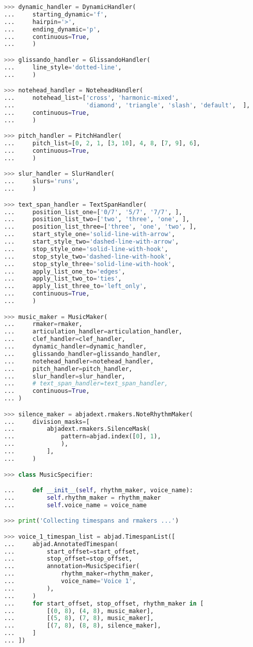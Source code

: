 \begin{lstlisting}[language=Python, caption=Demonstration of AttachmentHandlers]
>>> dynamic_handler = DynamicHandler(
...     starting_dynamic='f',
...     hairpin='>',
...     ending_dynamic='p',
...     continuous=True,
...     )

>>> glissando_handler = GlissandoHandler(
...     line_style='dotted-line',
...     )

>>> notehead_handler = NoteheadHandler(
...     notehead_list=['cross', 'harmonic-mixed',
...                    'diamond', 'triangle', 'slash', 'default',  ],
...     continuous=True,
...     )

>>> pitch_handler = PitchHandler(
...     pitch_list=[0, 2, 1, [3, 10], 4, 8, [7, 9], 6],
...     continuous=True,
...     )

>>> slur_handler = SlurHandler(
...     slurs='runs',
...     )

>>> text_span_handler = TextSpanHandler(
...     position_list_one=['0/7', '5/7', '7/7', ],
...     position_list_two=['two', 'three', 'one', ],
...     position_list_three=['three', 'one', 'two', ],
...     start_style_one='solid-line-with-arrow',
...     start_style_two='dashed-line-with-arrow',
...     stop_style_one='solid-line-with-hook',
...     stop_style_two='dashed-line-with-hook',
...     stop_style_three='solid-line-with-hook',
...     apply_list_one_to='edges',
...     apply_list_two_to='ties',
...     apply_list_three_to='left_only',
...     continuous=True,
...     )

>>> music_maker = MusicMaker(
...     rmaker=rmaker,
...     articulation_handler=articulation_handler,
...     clef_handler=clef_handler,
...     dynamic_handler=dynamic_handler,
...     glissando_handler=glissando_handler,
...     notehead_handler=notehead_handler,
...     pitch_handler=pitch_handler,
...     slur_handler=slur_handler,
...     # text_span_handler=text_span_handler,
...     continuous=True,
... )

>>> silence_maker = abjadext.rmakers.NoteRhythmMaker(
...     division_masks=[
...         abjadext.rmakers.SilenceMask(
...             pattern=abjad.index([0], 1),
...             ),
...         ],
...     )

>>> class MusicSpecifier:

...     def __init__(self, rhythm_maker, voice_name):
...         self.rhythm_maker = rhythm_maker
...         self.voice_name = voice_name

>>> print('Collecting timespans and rmakers ...')

>>> voice_1_timespan_list = abjad.TimespanList([
...     abjad.AnnotatedTimespan(
...         start_offset=start_offset,
...         stop_offset=stop_offset,
...         annotation=MusicSpecifier(
...             rhythm_maker=rhythm_maker,
...             voice_name='Voice 1',
...         ),
...     )
...     for start_offset, stop_offset, rhythm_maker in [
...         [(0, 8), (4, 8), music_maker],
...         [(5, 8), (7, 8), music_maker],
...         [(7, 8), (8, 8), silence_maker],
...     ]
... ])


\end{lstlisting}
